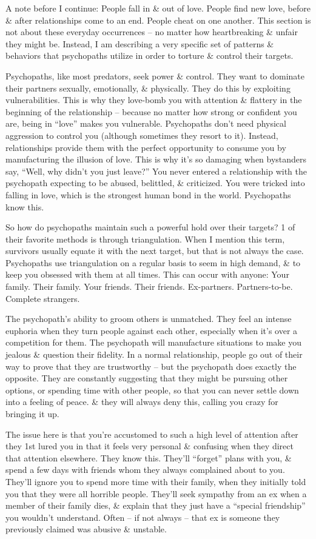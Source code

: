 \documentclass{article}
\numberwithin{equation}{section}
\begin{document}
A note before I continue: People fall in \& out of love. People find new love, before \& after relationships come to an end. People cheat on one another. This section is not about these everyday occurrences -- no matter how heartbreaking \& unfair they might be. Instead, I am describing a very specific set of patterns \& behaviors that psychopaths utilize in order to torture \& control their targets.

Psychopaths, like most predators, seek power \& control. They want to dominate their partners sexually, emotionally, \& physically. They do this by exploiting vulnerabilities. This is why they love-bomb you with attention \& flattery in the beginning of the relationship -- because no matter how strong or confident you are, being in ``love'' makes you vulnerable. Psychopaths don't need physical aggression to control you (although sometimes they resort to it). Instead, relationships provide them with the perfect opportunity to consume you by manufacturing the illusion of love. This is why it's so damaging when bystanders say, ``Well, why didn't you just leave?'' You never entered a relationship with the psychopath expecting to be abused, belittled, \& criticized. You were tricked into falling in love, which is the strongest human bond in the world. Psychopaths know this.

So how do psychopaths maintain such a powerful hold over their targets? 1 of their favorite methods is through triangulation. When I mention this term, survivors usually equate it with the next target, but that is not always the case. Psychopaths use triangulation on a regular basis to seem in high demand, \& to keep you obsessed with them at all times. This can occur with anyone: Your family. Their family. Your friends. Their friends. Ex-partners. Partners-to-be. Complete strangers.

The psychopath's ability to groom others is unmatched. They feel an intense euphoria when they turn people against each other, especially when it's over a competition for them. The psychopath will manufacture situations to make you jealous \& question their fidelity. In a normal relationship, people go out of their way to prove that they are trustworthy -- but the psychopath does exactly the opposite. They are constantly suggesting that they might be pursuing other options, or spending time with other people, so that you can never settle down into a feeling of peace. \& they will always deny this, calling you crazy for bringing it up.

The issue here is that you're accustomed to such a high level of attention after they 1st lured you in that it feels very personal \& confusing when they direct that attention elsewhere. They know this. They'll ``forget'' plans with you, \& spend a few days with friends whom they always complained about to you. They'll ignore you to spend more time with their family, when they initially told you that they were all horrible people. They'll seek sympathy from an ex when a member of their family dies, \& explain that they just have a ``special friendship'' you wouldn't understand. Often -- if not always -- that ex is someone they previously claimed was abusive \& unstable.
\end{document}
